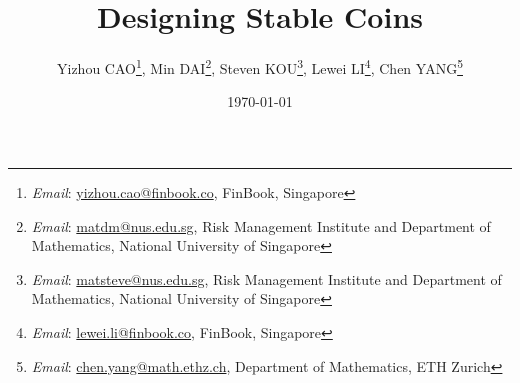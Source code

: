 \documentclass[final,pdftex]{ectaart}
\theoremstyle{plain}
\begin{document}
\begin{frontmatter}

\title{Designing Stable Coins}




\author{Yizhou CAO\thanks{\textit{Email}: \protect\href{mailto:yizhou.cao@finbook.co}{yizhou.cao@finbook.co},
FinBook, Singapore}, Min DAI\thanks{\textit{Email}: \protect\href{mailto:matdm@nus.edu.sg}{matdm@nus.edu.sg}, Risk Management Institute and Department of Mathematics, National University of Singapore}, Steven KOU\thanks{\textit{Email}: \protect\href{mailto:matsteve@nus.edu.sg}{matsteve@nus.edu.sg}, Risk Management Institute and Department of Mathematics, National University of Singapore}, Lewei LI\thanks{\textit{Email}: \protect\href{mailto:lewei.li@finbook.co}{lewei.li@finbook.co}, FinBook, Singapore}, Chen YANG\thanks{\textit{Email}: \protect\href{mailto:chen.yang@math.ethz.ch}{chen.yang@math.ethz.ch}, Department of Mathematics, ETH Zurich}}

\date{\today}


\end{frontmatter}
\end{document}
